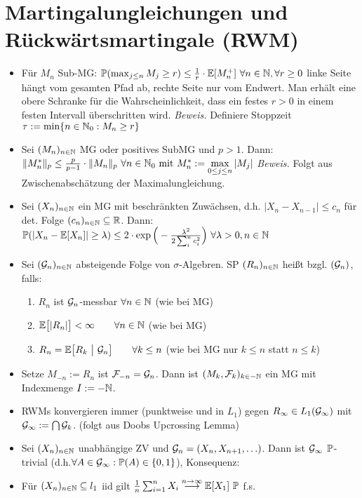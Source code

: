 \documentclass[12pt]{scrartcl}
\begin{document}
	\section{Martingalungleichungen und Rückwärtsmartingale (RWM)}
	
	\begin{itemize}
		\item {} Für $M_n$ Sub-MG: $\P(\max_{j\leq n} M_j\geq r)\leq\frac{1}{r}\cdot\E[M_n^+]~\forall n\in\N,\forall r\geq0$
	linke Seite hängt vom gesamten Pfad ab, rechte Seite nur vom Endwert.
	Man erhält eine obere Schranke für die Wahrscheinlichkeit, dass ein festes $r>0$ in einem festen Intervall überschritten wird.
	\textit{Beweis.} Definiere Stoppzeit $\tau:=\min\lbrace n\in\N_0:M_n\geq r\rbrace$
		\item {} Sei $(M_n)_{n\in\N}$ MG oder positives SubMG und $p>1$. Dann:\\
		$\Vert M_n^\ast\Vert_p\leq\frac{p}{p-1}\cdot\Vert M_n\Vert_p~\forall n\in\N_0\mit M_n^\ast:=\max\limits_{0\leq j\leq n}|M_j|$
		\textit{Beweis.} Folgt aus Zwischenabschätzung der Maximalungleichung.
		\item {} Sei $(X_n)_{n\in\N}$ ein MG mit beschränkten Zuwächsen, d.h. $|X_n-X_{n-1}|\leq c_n$ für det. Folge $(c_n)_{n\in\N}\subseteq\R$. Dann:
		$\P(|X_n-\E[X_n]|\geq\lambda)\leq 2\cdot\exp\Big(-\frac{\lambda^2}{2\sum_i^n c_i^2}\Big)~\forall\lambda>0, n\in\N$
		\item Sei $(\G_n)_{n\in\N}$ absteigende Folge von $\sigma$-Algebren. SP $(R_n)_{n\in\N}$ heißt  bzgl. $(\G_n)$, falls:
		\begin{enumerate}
			\item $R_n$ ist $\G_n$-messbar $\forall n\in\N$ (wie bei MG)
			\item $\begin{aligned}
				\E\big[|R_n|\big]<\infty\qquad\forall n\in\N
			\end{aligned}$ (wie bei MG)
			\item $\begin{aligned}
				R_n=\E\big[R_k~\big|~\G_n\big]\qquad\forall k\leq n
			\end{aligned}$ (wie bei MG nur $k\leq n$ statt $n\leq k$)
		\end{enumerate}
		\item Setze $M_{-n}:=R_n$ ist $\F_{-n}=\G_n$. Dann ist $(M_k,\F_k)_{k\in-\N}$ ein MG mit Indexmenge $I:=-\N$.
		\item RWMs konvergieren immer (punktweise und in $L_1$) gegen $R_\infty\in L_1(\G_\infty)$ mit  $\G_\infty:=\bigcap\G_k$. (folgt aus Doobs Upcrossing Lemma)
		\item {} Sei $(X_n)_{n\in\N}$ unabhängige ZV und $\G_n=(X_n,X_{n+1},\ldots)$. Dann ist $\G_\infty$ $\P$-trivial (d.h.$\forall A\in\G_\infty:\P(A)\in\lbrace0,1\rbrace$), Konsequenz:
		\item {} Für $(X_n)_{n\in\N}\subseteq l_1$ iid gilt $\frac{1}{n}\sum_{i=1}^n X_i\overset{n\to\infty}{\longrightarrow}\E[X_1]~\P$ f.s.
	\end{itemize}
		
\end{document}
